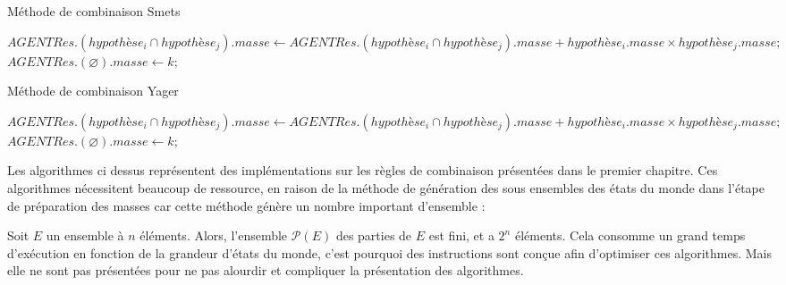 \vspace{3em}
\begin{algorithm}[H]
\setcounter{AlgoLine}{3}
\caption{Méthode de combinaison Smets}

$AGENTRes.(hypothèse_{i} \cap hypothèse_{j}).masse \gets AGENTRes.(hypothèse_{i} \cap hypothèse_{j}).masse + hypothèse_{i}.masse \times hypothèse_{j}.masse ;$
$AGENTRes.(\varnothing ).masse \gets k;$
\end{algorithm}
\vspace{3em}
\begin{algorithm}[H]
\setcounter{AlgoLine}{9}
\caption{Méthode de combinaison Yager}
$AGENTRes.(hypothèse_{i} \cap hypothèse_{j}).masse \gets AGENTRes.(hypothèse_{i} \cap hypothèse_{j}).masse + hypothèse_{i}.masse \times hypothèse_{j}.masse ;$
$AGENTRes.(\varnothing ).masse \gets k;$
\end{algorithm}
\vspace{3em}
Les algorithmes ci dessus représentent des implémentations sur les règles de combinaison présentées dans le premier chapitre. Ces algorithmes nécessitent beaucoup de ressource, en raison de la méthode de génération des sous ensembles des états du monde dans l'étape de préparation des masses car cette méthode génère un nombre important d'ensemble :

Soit $E$ un ensemble à $n$ éléments. Alors, l'ensemble $\mathcal{P}(E)$ des parties de $E$ est fini, et a \textbf{$2^n$} éléments.
 \newpage
\vspace{4em}
Cela consomme un grand temps d'exécution en fonction de la grandeur d'états du monde, c'est pourquoi des instructions sont conçue afin  d'optimiser ces algorithmes. Mais elle ne sont pas présentées pour ne pas alourdir et compliquer la présentation des algorithmes.
\vspace{2em}
